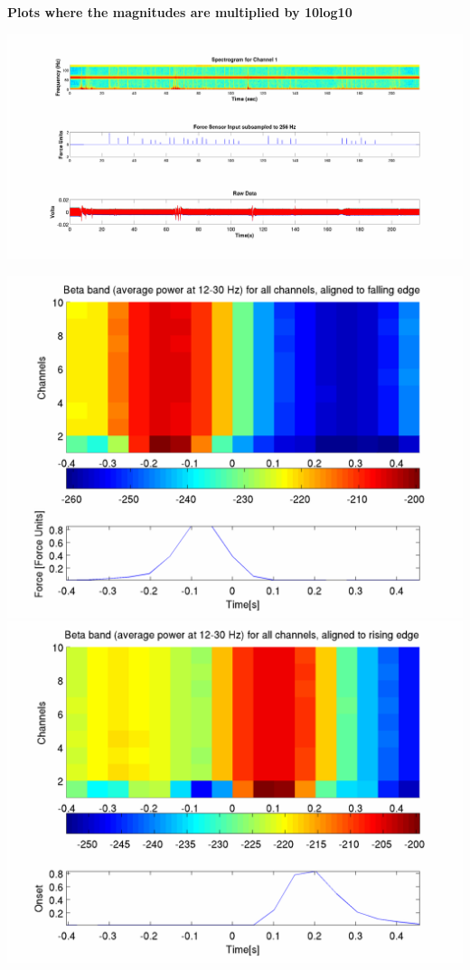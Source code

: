 \documentclass[12pt]{article}
\begin{document}
\begin{center}
\textbf{Plots where the magnitudes are multiplied by 10log10}
\end{center}

\includegraphics[scale=0.14]{raw_data_spectrogram.png}

\includegraphics[scale=0.2]{beta_falling_log.png}
\includegraphics[scale=0.2]{beta_rising_log.png}
\end{document}
